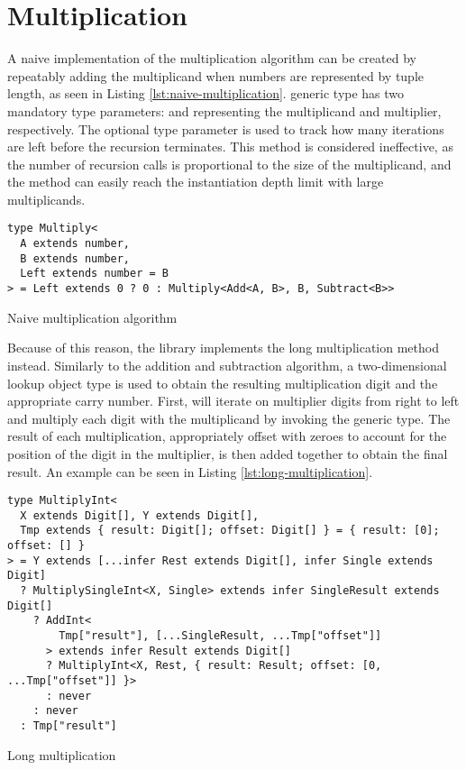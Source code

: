 \section{Multiplication}

A naive implementation of the multiplication algorithm can be created by repeatably adding the multiplicand when numbers are represented by tuple length, as seen in Listing \ref{lst:naive-multiplication}.  generic type has two mandatory type parameters:  and  representing the multiplicand and multiplier, respectively. The optional type parameter  is used to track how many iterations are left before the recursion terminates. This method is considered ineffective, as the number of recursion calls is proportional to the size of the multiplicand, and the method can easily reach the instantiation depth limit with large multiplicands.

\begin{listing}[ht]
  \begin{verbatim}
type Multiply<
  A extends number,
  B extends number,
  Left extends number = B
> = Left extends 0 ? 0 : Multiply<Add<A, B>, B, Subtract<B>>
\end{verbatim}
  \caption{Naive multiplication algorithm}\label{lst:naive-multiplication}
\end{listing}

Because of this reason, the library implements the long multiplication method instead. Similarly to the addition and subtraction algorithm, a two-dimensional lookup object type is used to obtain the resulting multiplication digit and the appropriate carry number. First,  will iterate on multiplier digits from right to left and multiply each digit with the multiplicand by invoking the  generic type. The result of each multiplication, appropriately offset with zeroes to account for the position of the digit in the multiplier, is then added together to obtain the final result. An example can be seen in Listing \ref{lst:long-multiplication}.

\begin{listing}[ht]
  \begin{verbatim}
type MultiplyInt<
  X extends Digit[], Y extends Digit[],
  Tmp extends { result: Digit[]; offset: Digit[] } = { result: [0]; offset: [] }
> = Y extends [...infer Rest extends Digit[], infer Single extends Digit]
  ? MultiplySingleInt<X, Single> extends infer SingleResult extends Digit[]
    ? AddInt<
        Tmp["result"], [...SingleResult, ...Tmp["offset"]]
      > extends infer Result extends Digit[]
      ? MultiplyInt<X, Rest, { result: Result; offset: [0, ...Tmp["offset"]] }>
      : never
    : never
  : Tmp["result"]
\end{verbatim}
  \caption{Long multiplication}\label{lst:long-multiplication}
\end{listing}

